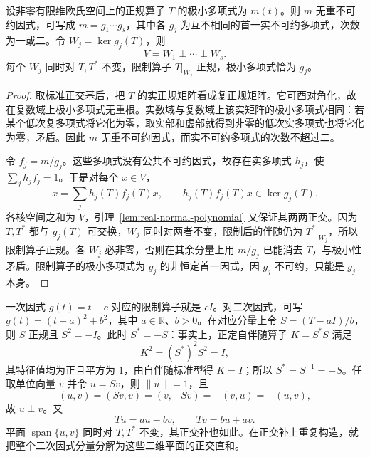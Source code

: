 \begin{proposition}
\label{prop:real-normal-primary-decomposition}
设非零有限维欧氏空间上的正规算子 $T$ 的极小多项式为 $m(t)$。则 $m$ 无重不可约因式，可写成 $m=g_1\cdots g_s$，其中各 $g_j$ 为互不相同的首一实不可约多项式，次数为一或二。令 $W_j=\ker g_j(T)$，则
\[
    V=W_1\mathbin\perp\cdots\mathbin\perp W_s.
\]
每个 $W_j$ 同时对 $T,T^*$ 不变，限制算子 $T|_{W_j}$ 正规，极小多项式恰为 $g_j$。
\end{proposition}
\begin{proof}
取标准正交基后，把 $T$ 的实正规矩阵看成复正规矩阵。它可酉对角化，故在复数域上极小多项式无重根。实数域与复数域上该实矩阵的极小多项式相同：若某个低次复多项式将它化为零，取实部和虚部就得到非零的低次实多项式也将它化为零，矛盾。因此 $m$ 无重不可约因式，而实不可约多项式的次数不超过二。

令 $f_j=m/g_j$。这些多项式没有公共不可约因式，故存在实多项式 $h_j$，使 $\sum_jh_jf_j=1$。于是对每个 $x\in V$，
\[
    x=\sum_j h_j(T)f_j(T)x,
    \qquad h_j(T)f_j(T)x\in\ker g_j(T).
\]
各核空间之和为 $V$，引理~\ref{lem:real-normal-polynomial} 又保证其两两正交。因为 $T,T^*$ 都与 $g_j(T)$ 可交换，$W_j$ 同时对两者不变，限制后的伴随仍为 $T^*|_{W_j}$，所以限制算子正规。各 $W_j$ 必非零，否则在其余分量上用 $m/g_j$ 已能消去 $T$，与极小性矛盾。限制算子的极小多项式为 $g_j$ 的非恒定首一因式，因 $g_j$ 不可约，只能是 $g_j$ 本身。
\end{proof}

一次因式 $g(t)=t-c$ 对应的限制算子就是 $cI$。对二次因式，可写 $g(t)=(t-a)^2+b^2$，其中 $a\in\mathbb R$、$b>0$。在对应分量上令 $S=(T-aI)/b$，则 $S$ 正规且 $S^2=-I$。此时 $S^*=-S$：事实上，正定自伴随算子 $K=S^*S$ 满足
\[
    K^2=(S^*)^2S^2=I,
\]
其特征值均为正且平方为 $1$，由自伴随标准型得 $K=I$；所以 $S^*=S^{-1}=-S$。任取单位向量 $v$ 并令 $u=Sv$，则 $\|u\|=1$，且
\[
    (u,v)=(Sv,v)=(v,-Sv)=-(v,u)=-(u,v),
\]
故 $u\perp v$。又
\begin{equation}
\label{eq:real-normal-two-dimensional-action}
    Tu=au-bv,\qquad Tv=bu+av.
\end{equation}
平面 $\operatorname{span}\{u,v\}$ 同时对 $T,T^*$ 不变，其正交补也如此。在正交补上重复构造，就把整个二次因式分量分解为这些二维平面的正交直和。

